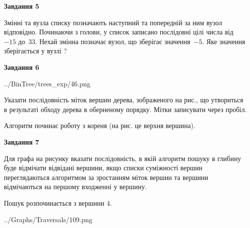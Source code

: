 \documentclass[12pt, ukrainian]{article}
\begin{document}
{\begin {large}
{\begin {center}\textbf{Завдання 5}\end {center}}\par
Змінні  та  вузла списку позначають наступний та попередній за ним вузол відповідно. Починаючи з голови, у список записано послідовні цілі числа від~$-15$ до~$33$. Нехай змінна  позначає вузол, що зберігає значення~$-5$.
Яке значення зберігається у вузлі  ?\par
\newpage

{\begin {center}\textbf{Завдання 6}\end {center}}\par

\begin{center}
	{../BinTree/trees_exp/46.png}
\end{center}
Указати послідовність міток вершин дерева, зображеного на рис., що утвориться в результаті обходу дерева в оберненому порядку. Мітки записувати через пробіл.\par Алгоритм починає роботу з кореня (на рис. це верхня вершина).\par
\newpage

{\begin {center}\textbf{Завдання 7}\end {center}}\par
Для графа на рисунку вказати послідовність, в якій алгоритм пошуку в глибину буде відмічати відвідані вершини, якщо списки суміжності вершин переглядаються алгоритмом за зростанням міток вершин та вершини відмічаються на першому вход\-женні у вершину.\par
Пошук розпочинається з вершини 4.\par

\begin{center}
	{../Graphs/Traversals/109.png}
\end{center}\par
\newpage


\end{large}}
\end{document}
